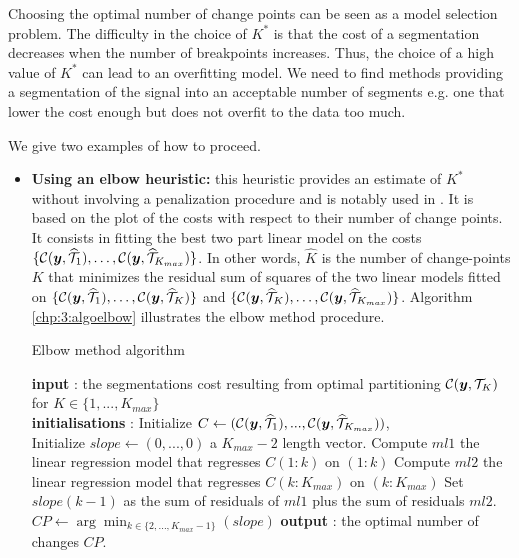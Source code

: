Choosing the optimal number of change points can be seen as a model selection problem. The difficulty in the choice of $K^*$ is that the cost of a segmentation decreases when the number of breakpoints increases. Thus, the choice of a high value of $K^*$ can lead to an overfitting model. We need to find methods providing a segmentation of the signal into an acceptable number of segments e.g. one that lower the cost enough but does not overfit to the data too much. 

We give two examples of how to proceed.

\begin{itemize}
\item \textbf{Using an elbow heuristic:} this heuristic provides an estimate of $K^*$ without involving a penalization procedure and is notably used in \cite{lung2015}. It is based on the plot of the costs with respect to their number of change points. It consists in fitting the best two part linear model on the costs $\{{\mathcal C}(\bm y, \widehat{{\mathcal T}}_1),\dots,{\mathcal C}(\bm y, \widehat{{\mathcal T}}_{K_{max}})\}$. In other words, $\widehat{K}$ is the number of change-points $K$ that minimizes the residual sum of squares of the two linear models fitted on $\{{\mathcal C}(\bm y, \widehat{{\mathcal T}}_1),\dots,{\mathcal C}(\bm y, \widehat{{\mathcal T}}_{K})\}$ and $\{{\mathcal C}(\bm y, \widehat{{\mathcal T}}_K),\dots,{\mathcal C}(\bm y, \widehat{{\mathcal T}}_{K_{max}})\}$. Algorithm \ref{chp:3:algoelbow} illustrates the elbow method procedure.
\begin{algorithm}[ht]
\caption{Elbow method algorithm}\label{chp:3:algoelbow}
\begin{algorithmic}
\State \textbf{input} : the segmentations cost resulting from optimal partitioning ${\mathcal C}(\bm y, {\mathcal T}_{K})$ for $K \in \{1,...,K_{max}\}$ \\
\State \textbf{initialisations} : Initialize $C \gets ({\mathcal C}(\bm y, \widehat{{\mathcal T}}_{1}),...,{\mathcal C}(\bm y, \widehat{{\mathcal T}}_{K_{max}}))$, \\
Initialize $slope \gets (0,...,0)$  a $K_{max}-2$ length vector. 
  \State Compute $ml1$ the linear regression model that regresses $C(1:k)$ on $(1:k)$
  \State Compute $ml2$ the linear regression model that regresses $C(k:K_{max})$ on $(k:K_{max})$
  \State Set $slope(k-1)$ as the sum of residuals of $ml1$ plus the sum of residuals $ml2$.
\EndFor
\State $CP \gets \arg\min_{k\in\{2,...,K_{max}-1\}}(slope)$
\State \textbf{output} : the optimal number of changes $CP$. 
\end{algorithmic}

\end{algorithm}
\end{itemize}

